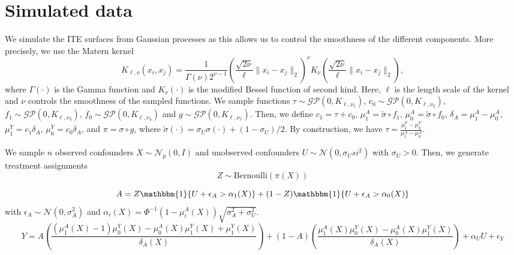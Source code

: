 \documentclass[nonatbib]{article}
\theoremstyle{definition}
\theoremstyle{plain}
\begin{document}
\section{Simulated data}\label{app:sim}
We simulate the ITE surfaces from Gaussian processes as this allows us to control the smoothness of the different components. More precisely, we use the Matern kernel
\begin{equation}
    K_{\ell, \nu}(x_i, x_j) = \frac{1}{\Gamma(\nu)2^{\nu-1}}\left( \frac{\sqrt{2\nu}}{\ell} \| x_i - x_j\|_2  \right)^\nu K_\nu \left(\frac{\sqrt{2\nu}}{\ell} \| x_i - x_j\|_2 \right),
\end{equation}
where $\Gamma(\cdot)$ is the Gamma function and $K_\nu(\cdot)$ is the modified Bessel function of second kind. Here, $\ell$ is the length scale of the kernel and $\nu$ controls the smoothness of the sampled functions. We sample functions $\tau \sim \mathcal{GP}(0, K_{\ell, \nu_1})$, $c_0 \sim \mathcal{GP}(0, K_{\ell, \nu_2})$, $f_1 \sim \mathcal{GP}(0, K_{\ell, \nu_3})$, $f_0 \sim \mathcal{GP}(0, K_{\ell, \nu_4})$ and $g \sim \mathcal{GP}(0, K_{\ell, \nu_5})$. 
Then, we define $c_1= \tau + c_0$, $\mu_1^A = \widetilde{\sigma} \circ f_1$, $\mu_0^A = \widetilde{\sigma} \circ f_0$, $\delta_A = \mu_1^A - \mu_0^A$, $\mu_1^Y = c_1 \delta_A$, $\mu_0^Y = c_0 \delta_A$, and $\pi = \sigma \circ g$, where $\widetilde{\sigma}(\cdot) = \sigma_U \sigma(\cdot) + (1-\sigma_U)/2$. By construction, we have $\tau = \frac{\mu_1^Y - \mu_0^Y}{\mu_1^A - \mu_0^A}$.

We sample $n$ observed confounders $X \sim \mathcal{N}_p(0,I)$ and unobserved confounders $U \sim \mathcal{N}\left(0, \sigma_Usi^2\right)$ with $\sigma_U > 0$. Then, we generate treatment assignments
 \begin{equation}
     Z \sim \mathrm{Bernoulli}(\pi(X))
 \end{equation}
 
\begin{equation}
     A = Z \mathbbm{1}\{U + \epsilon_{A} > \alpha_1(X)\} + (1-Z) \mathbbm{1}\{U + \epsilon_{A} > \alpha_0(X)\}
\end{equation}
with $\epsilon_{A} \sim \mathcal{N}\left(0, \sigma_A^2\right)$ and $\alpha_i(X) = \Phi^{-1}\left(1 - \mu_i^A(X)\right) \sqrt{\sigma_A^2 + \sigma_U^2}$.
\begin{equation}
     Y = A \left( \frac{(\mu_1^A(X) - 1)\mu_0^Y(X) - \mu_0^A(X)\mu_1^Y(X) + \mu_1^Y(X)}{\delta_A(X)}\right)+ (1-A) \left( \frac{\mu_1^A(X)\mu_0^Y(X) - \mu_0^A(X)\mu_1^Y(X)}{\delta_A(X)} \right) + \alpha_U U +\epsilon_Y
\end{equation}
 
\end{document}
